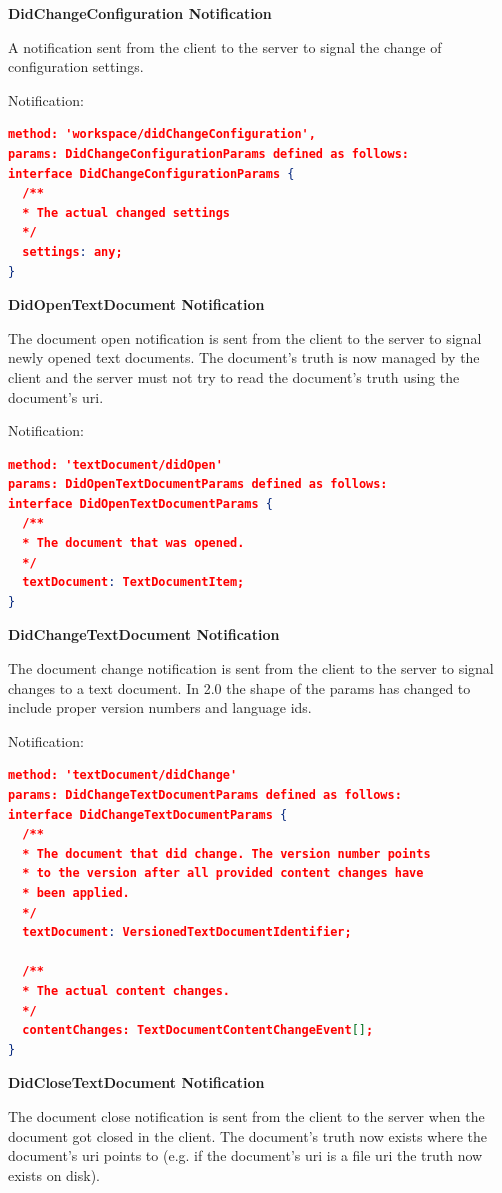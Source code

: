 \textbf{DidChangeConfiguration Notification}

A notification sent from the client to the server to signal the change of configuration settings.

Notification:
\begin{lstlisting}[language=json,firstnumber=1]
method: 'workspace/didChangeConfiguration',
params: DidChangeConfigurationParams defined as follows:
interface DidChangeConfigurationParams {
  /**
  * The actual changed settings
  */
  settings: any;
}
\end{lstlisting}

\textbf{DidOpenTextDocument Notification}

The document open notification is sent from the client to the server to signal newly opened text documents. The document's truth is now managed by the client and the server must not try to read the document's truth using the document's uri.

Notification:
\begin{lstlisting}[language=json,firstnumber=1]
method: 'textDocument/didOpen'
params: DidOpenTextDocumentParams defined as follows:
interface DidOpenTextDocumentParams {
  /**
  * The document that was opened.
  */
  textDocument: TextDocumentItem;
}
\end{lstlisting}

\textbf{DidChangeTextDocument Notification}

The document change notification is sent from the client to the server to signal changes to a text document. In 2.0 the shape of the params has changed to include proper version numbers and language ids.

Notification:
\begin{lstlisting}[language=json,firstnumber=1]
method: 'textDocument/didChange'
params: DidChangeTextDocumentParams defined as follows:
interface DidChangeTextDocumentParams {
  /**
  * The document that did change. The version number points
  * to the version after all provided content changes have
  * been applied.
  */
  textDocument: VersionedTextDocumentIdentifier;
	
  /**
  * The actual content changes.
  */
  contentChanges: TextDocumentContentChangeEvent[];
}
\end{lstlisting}

\textbf{DidCloseTextDocument Notification}

The document close notification is sent from the client to the server when the document got closed in the client. The document's truth now exists where the document's uri points to (e.g. if the document's uri is a file uri the truth now exists on disk).

